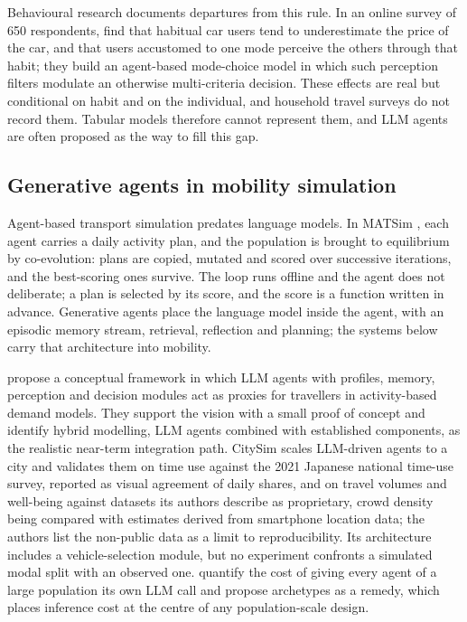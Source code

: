Behavioural research documents departures from this rule. In an online survey of 650 respondents, \citet{adam2025survey} find that habitual car users tend to underestimate the price of the car, and that users accustomed to one mode perceive the others through that habit; they build an agent-based mode-choice model in which such perception filters modulate an otherwise multi-criteria decision. These effects are real but conditional on habit and on the individual, and household travel surveys do not record them. Tabular models therefore cannot represent them, and LLM agents are often proposed as the way to fill this gap.

\subsection{Generative agents in mobility simulation}
\label{sec:agents}

Agent-based transport simulation predates language models. In MATSim \citep{horni2016matsim}, each agent carries a daily activity plan, and the population is brought to equilibrium by co-evolution: plans are copied, mutated and scored over successive iterations, and the best-scoring ones survive. The loop runs offline and the agent does not deliberate; a plan is selected by its score, and the score is a function written in advance. Generative agents \citep{park2023generative} place the language model inside the agent, with an episodic memory stream, retrieval, reflection and planning; the systems below carry that architecture into mobility.

\citet{liu2024toward} propose a conceptual framework in which LLM agents with profiles, memory, perception and decision modules act as proxies for travellers in activity-based demand models. They support the vision with a small proof of concept and identify hybrid modelling, LLM agents combined with established components, as the realistic near-term integration path. CitySim \citep{bougie2025citysim} scales LLM-driven agents to a city and validates them on time use against the 2021 Japanese national time-use survey, reported as visual agreement of daily shares, and on travel volumes and well-being against datasets its authors describe as proprietary, crowd density being compared with estimates derived from smartphone location data; the authors list the non-public data as a limit to reproducibility. Its architecture includes a vehicle-selection module, but no experiment confronts a simulated modal split with an observed one. \citet{chopra2024limits} quantify the cost of giving every agent of a large population its own LLM call and propose archetypes as a remedy, which places inference cost at the centre of any population-scale design.

